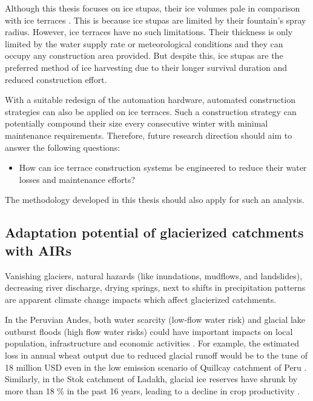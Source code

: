 Although this thesis focuses on ice stupas, their ice volumes pale in comparison with ice terraces
\citep{nusserSociohydrologyArtificialGlaciers2019}. This is because ice stupas are limited by their fountain's
spray radius. However, ice terraces have no such limitations. Their thickness is only limited by the water
supply rate or meteorological conditions and they can occupy any construction area provided. But despite this, ice
stupas are the preferred method of ice harvesting due to their longer survival duration and reduced construction
effort.

With a suitable redesign of the automation hardware, automated construction strategies can also be applied on
ice terraces. Such a construction strategy can potentially compound their size every consecutive winter with
minimal maintenance requirements. Therefore, future research direction should aim to answer the following
questions:

\begin{itemize}

	\item How can ice terrace construction systems be engineered to reduce their water losses and maintenance
	      efforts?

\end{itemize}

The methodology developed in this thesis should also apply for such an analysis.


\subsection{Adaptation potential of glacierized catchments with AIRs}

Vanishing glaciers, natural hazards (like inundations, mudflows, and landslides), decreasing river discharge,
drying springs, next to shifts in precipitation patterns are apparent climate change impacts which affect
glacierized catchments.

In the Peruvian Andes, both water scarcity (low-flow water risk) and glacial lake outburst floods (high flow
water risks) could have important impacts on local population, infrastructure and economic activities
\citep{motschmannIntegratedAssessmentsWater2020}. For example, the estimated loss in annual wheat output due to
reduced glacial runoff would be to the tune of 18 million USD even in the low emission scenario of Quillcay catchment
of Peru \citep{motschmannLossesDamagesConnected2020}. Similarly, in the Stok catchment of Ladakh, glacial ice
reserves have shrunk by more than 18 \% in the past 16 years, leading to a decline in crop productivity
\citep{sohebSpatiotemporalQuantificationKey2022}.

